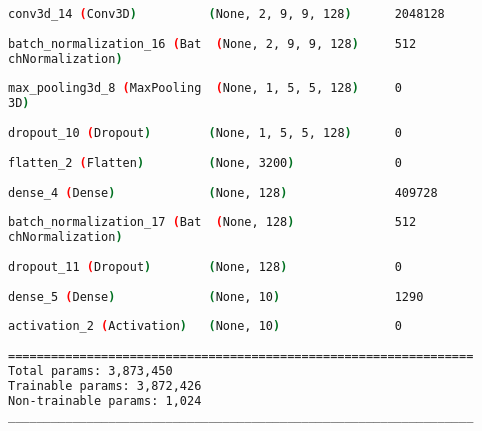 \begin{lstlisting}[language=Bash,caption={Overview of layers in 3D convolutional network},label={lst:3d_conv_layers},numbers=none,float=htb]
conv3d_14 (Conv3D)          (None, 2, 9, 9, 128)      2048128   
                                                                
batch_normalization_16 (Bat  (None, 2, 9, 9, 128)     512       
chNormalization)                                                
                                                                
max_pooling3d_8 (MaxPooling  (None, 1, 5, 5, 128)     0         
3D)                                                             
                                                                
dropout_10 (Dropout)        (None, 1, 5, 5, 128)      0         
                                                                
flatten_2 (Flatten)         (None, 3200)              0         
                                                                
dense_4 (Dense)             (None, 128)               409728    
                                                                
batch_normalization_17 (Bat  (None, 128)              512       
chNormalization)                                                
                                                                
dropout_11 (Dropout)        (None, 128)               0         
                                                                
dense_5 (Dense)             (None, 10)                1290      
                                                                
activation_2 (Activation)   (None, 10)                0         
                                                                
=================================================================
Total params: 3,873,450
Trainable params: 3,872,426
Non-trainable params: 1,024
_________________________________________________________________
\end{lstlisting}

